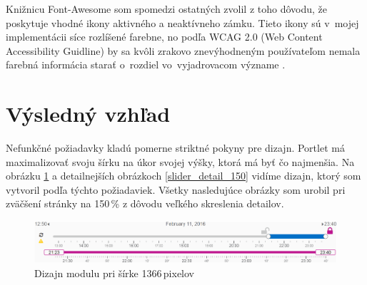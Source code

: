 \documentclass[
  digital, %
  twoside, %
  notable,   %
  nolof,   %
  nolot,   %
]{fithesis3}
\begin{document}
Knižnicu Font-Awesome som spomedzi ostatných zvolil z toho dôvodu, že poskytuje vhodné ikony aktivného a neaktívneho zámku. Tieto ikony sú v~mojej implementácii síce rozlíšené farebne, no podľa WCAG 2.0 (Web Content Accessibility Guidline) by sa kvôli zrakovo znevýhodneným používateľom nemala farebná informácia starať o~rozdiel vo~vyjadrovacom význame \cite[sekcia~1.4]{caldwell2008web}.

\section{Výsledný vzhľad}
\label{design_created}
Nefunkčné požiadavky kladú pomerne striktné pokyny pre dizajn. Portlet má maximalizovať svoju šírku na úkor svojej výšky, ktorá má byť čo najmenšia. Na obrázku \ref{slider_150} a detailnejších obrázkoch \ref{slider_detail_150} vidíme dizajn, ktorý som vytvoril podľa týchto požiadaviek. Všetky nasledujúce obrázky som urobil pri zväčšení stránky na 150\,\% z dôvodu veľkého skreslenia detailov.

\begin{figure}[H]
	\center
	\includegraphics[width=1.0\linewidth]{slider_150}
	\caption{Dizajn modulu pri šírke 1366\,pixelov}
	\label{slider_150}
\end{figure}
\end{document}
